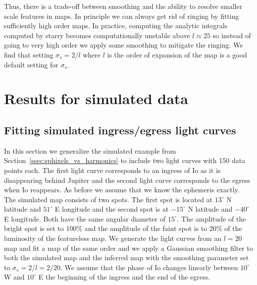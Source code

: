 \documentclass[modern]{aastex62}
\begin{document}
Thus, there is a trade-off between smoothing and the ability to resolve smaller scale features
in maps. 
In principle we can always get rid of ringing by fitting sufficiently high order maps.
In practice, computing the analytic integrals computed by \textsf{starry} becomes computationally unstable above $l\approx 25$ so instead of going to very high order we apply some smoothing to mitigate the ringing.
We find that setting $\sigma_s=2/l$ where $l$ is the order of expansion of the map  is a good default setting for $\sigma_s$.

\section{Results for simulated data}
\label{sec:results_sim}
\subsection{Fitting simulated ingress/egress light curves}
\label{ssec:fitting_sim_ingress_egress}
In this section we generalize the simulated example from Section~\ref{ssec:sphixels_vs_harmonics} to include two light curves with 150 data points each.
The first light curve corresponds to an ingress of Io as it is disappearing behind Jupiter and the second light curve corresponds to the egress when Io reappears. 
As before we assume that we know the ephemeris exactly.
The simulated map consists of two spots.
The first spot is located at $13^\circ$ N latitude and $51^\circ$ E longitude and the second spot is at $-15^\circ$ N latitude and $-40^\circ$ E longitude.
Both have the same angular diameter of $15^\circ$.
The amplitude of the bright spot is set to 100\% and the amplitude of the faint spot is to 20\% of the luminosity of the featureless map. 
We generate the light curves from an $l=20$ map and fit a map of the same order and we apply a Gaussian smoothing filter to both the simulated map and the inferred map with the smoothing parameter set to $\sigma_s=2/l=2/20$.
We assume that the phase of Io changes linearly between $10^\circ$ W and $10^\circ$ E the beginning of the ingress and the end of the egress.
\end{document}
